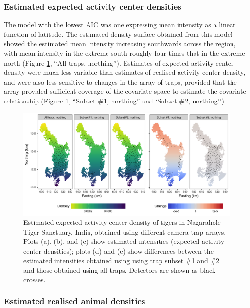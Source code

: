\documentclass[10pt,a4paper]{article}
\begin{document}
\subsubsection{Estimated expected activity center densities}

The model with the lowest AIC was one expressing mean intensity as a linear function of latitude. The estimated density surface obtained from this model showed the estimated mean intensity increasing southwards across the region, with mean intensity in the extreme south roughly four times that in the extreme north (Figure \ref{tigercov}, ``All traps, northing''). Estimates of expected activity center density were much less variable than estimates of realised activity center density, and were also less sensitive to changes in the array of traps, provided that the array provided sufficient coverage of the covariate space to estimate the covariate relationship (Figure \ref{tigercov}, ``Subset \#1, northing'' and `Subset \#2, northing''). 

\begin{figure}[htbp]
\centering
\includegraphics[width=1\textwidth]{tiger_surfaces_covs.png}
\caption{Estimated expected activity center density of tigers in Nagarahole Tiger Sanctuary, India, obtained using different camera trap arrays. Plots (a), (b), and (c) show estimated intensities (expected activity center densities); plots (d) and (e) show differences between the estimated intensities obtained using using trap subset \#1 and \#2 and those obtained using all traps. Detectors are shown as black crosses.}
\label{tigercov}
\end{figure}

\subsubsection{Estimated realised animal densities}
\end{document}
